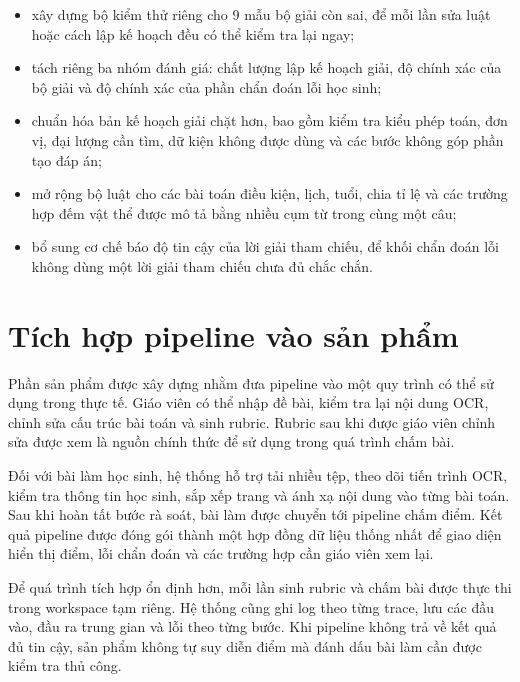 \documentclass[12pt,a4paper]{article}
\begin{document}
\begin{itemize}[leftmargin=*]
    \item xây dựng bộ kiểm thử riêng cho 9 mẫu bộ giải còn sai, để mỗi lần sửa
    luật hoặc cách lập kế hoạch đều có thể kiểm tra lại ngay;
    \item tách riêng ba nhóm đánh giá: chất lượng lập kế hoạch giải, độ chính
    xác của bộ giải và độ chính xác của phần chẩn đoán lỗi học sinh;
    \item chuẩn hóa bản kế hoạch giải chặt hơn, bao gồm kiểm tra kiểu phép toán,
    đơn vị, đại lượng cần tìm, dữ kiện không được dùng và các bước không góp phần
    tạo đáp án;
    \item mở rộng bộ luật cho các bài toán điều kiện, lịch, tuổi, chia tỉ lệ và
    các trường hợp đếm vật thể được mô tả bằng nhiều cụm từ trong cùng một câu;
    \item bổ sung cơ chế báo độ tin cậy của lời giải tham chiếu, để khối chẩn
    đoán lỗi không dùng một lời giải tham chiếu chưa đủ chắc chắn.
\end{itemize}
\section{Tích hợp pipeline vào sản phẩm}

Phần sản phẩm được xây dựng nhằm đưa pipeline vào một quy trình có thể sử dụng
trong thực tế. Giáo viên có thể nhập đề bài, kiểm tra lại nội dung OCR, chỉnh sửa
cấu trúc bài toán và sinh rubric. Rubric sau khi được giáo viên chỉnh sửa được
xem là nguồn chính thức để sử dụng trong quá trình chấm bài.

Đối với bài làm học sinh, hệ thống hỗ trợ tải nhiều tệp, theo dõi tiến trình OCR,
kiểm tra thông tin học sinh, sắp xếp trang và ánh xạ nội dung vào từng bài toán.
Sau khi hoàn tất bước rà soát, bài làm được chuyển tới pipeline chấm điểm. Kết quả
pipeline được đóng gói thành một hợp đồng dữ liệu thống nhất để giao diện hiển thị
điểm, lỗi chẩn đoán và các trường hợp cần giáo viên xem lại.

Để quá trình tích hợp ổn định hơn, mỗi lần sinh rubric và chấm bài được thực thi
trong workspace tạm riêng. Hệ thống cũng ghi log theo từng trace, lưu các đầu vào,
đầu ra trung gian và lỗi theo từng bước. Khi pipeline không trả về kết quả đủ tin
cậy, sản phẩm không tự suy diễn điểm mà đánh dấu bài làm cần được kiểm tra thủ công.

\end{document}
